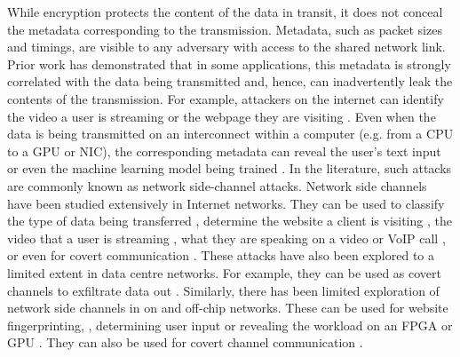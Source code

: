 While encryption protects the content of the data in transit, it does not conceal the metadata corresponding to the transmission.
Metadata, such as packet sizes and timings, are visible to any adversary with access to the shared network link.
Prior work has demonstrated that in some applications, this metadata is strongly correlated with the data being transmitted and, hence, can inadvertently leak the contents of the transmission.
For example, attackers on the internet can identify the video a user is streaming \cite{schuster2017beautyburst} or the webpage they are visiting \cite{gong2010fingerprinting, wang2014supersequence}.
Even when the data is being transmitted on an interconnect within a computer (e.g. from a CPU to a GPU or NIC), the corresponding metadata can reveal the user's text input or even the machine learning model being trained \cite{tan2021invisible}.
In the literature, such attacks are commonly known as network side-channel attacks.
Network side channels have been studied extensively in Internet networks.
They can be used to classify the type of data being transferred \cite{shapira2019flowpic}, determine the website a client is visiting \cite{bhat2019varcnn, dyer2012peek, hayes2016kfp, sirinam2018df}, the video that a user is streaming \cite{schuster2017beautyburst}, what they are speaking on a video or VoIP call \cite{white2011phonotactic}, or even for covert communication \cite{barradas2020poking}.
These attacks have also been explored to a limited extent in data centre networks.
For example, they can be used as covert channels to exfiltrate data out \cite{tahir2016sneak}.
Similarly, there has been limited exploration of network side channels in on and off-chip networks. 
These can be used for website fingerprinting, \cite{tan2021invisible, side2022lockeddown}, determining user input \cite{tan2021invisible, rodrigues2024busted} or revealing the workload on an FPGA or GPU \cite{tan2021invisible, giechaskiel2022cross, fang2023gotcha}.
They can also be used for covert channel communication \cite{khaliq2021timing, giechaskiel2022cross, side2022lockeddown, dutta2023spy}.

